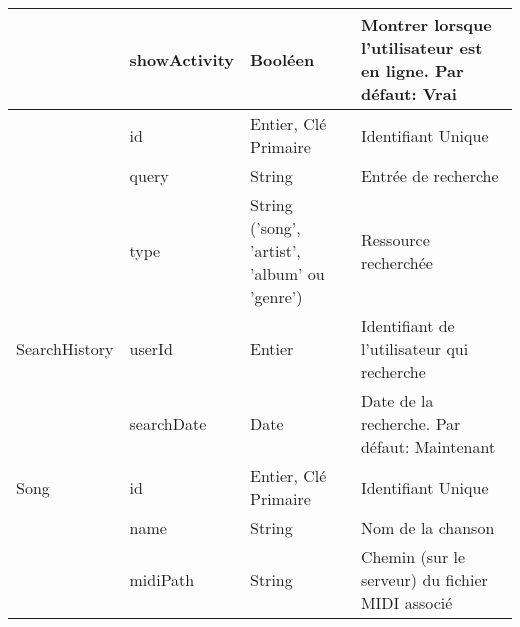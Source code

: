 \begin{longtable}[c]{@{}|p{}|p{}|p{}|p{}|@{}}
									                    & showActivity                                         & Booléen                                                                                  & Montrer lorsque l’utilisateur est en ligne. Par défaut: Vrai                             \\* \hline
														& id                                                   & Entier, Clé Primaire                                                                     & Identifiant Unique                                                                       \\* \cline{2-4} 
														& query                                                & String                                                                                   & Entrée de recherche                                                                      \\* \cline{2-4} 
														& type                                                 & String ('song', 'artist',  'album' ou 'genre') & Ressource recherchée                                                                     \\* \cline{2-4} 
	\multirow{-4}{*}{SearchHistory}						& userId                                               & Entier                                                                                   & Identifiant de l’utilisateur qui recherche                                               \\* \cline{2-4} 
									                    & searchDate                                           & Date                                                                                     & Date de la recherche. Par défaut: Maintenant                                             \\* \hline
	\multirow{0}{*}{Song}								& id                                                   & Entier, Clé Primaire                                                                     & Identifiant Unique                                                                       \\* \cline{2-4} 
														& name                                                 & String                                                                                   & Nom de la chanson                                                                        \\* \cline{2-4} 
														& midiPath                                             & String                                                                                   & Chemin (sur le serveur) du fichier MIDI associé                                          \\* \cline{2-4} 

\end{longtable}
